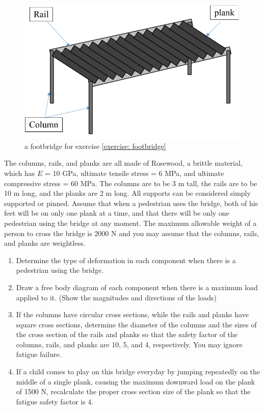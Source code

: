 \documentclass[
10pt,
a4paper,
openany,
svgnames,
]{book}
\begin{document}
\begin{exercises}
  \begin{figure}[H]
    \centering
    \includegraphics[scale=0.8]{pictures/Simple-load-bearing/footbridge}
    \caption{a footbridge for exercise \ref{exercise: footbridge}}
    \label{fig: footbridge exercise}
  \end{figure}
  
  The columns, rails, and planks are all made of Rosewood, a brittle material, which has $E$ = 10 GPa, ultimate tensile stress = 6 MPa, and ultimate compressive stress = 60 MPa. The columns are to be 3 m tall, the rails are to be 10 m long, and the planks are 2 m long. All supports can be considered simply supported or pinned. Assume that when a pedestrian uses the bridge, both of his feet will be on only one plank at a time, and that there will be only one pedestrian using the bridge at any moment. The maximum allowable weight of a person to cross the bridge is 2000 N and you may assume that the columns, rails, and planks are weightless.
  \begin{enumerate}
  \item Determine the type of deformation in each component when there is a pedestrian using the bridge.
  \item Draw a free body diagram of each component when there is a maximum load applied to it. (Show the magnitudes and directions of the loads)
  \item If the columns have circular cross sections, while the rails and planks have square cross sections, determine the diameter of the columns and the sizes of the cross section of the rails and planks so that the safety factor of the columns, rails, and planks are 10, 5, and 4, respectively. You may ignore fatigue failure.
  \item If a child comes to play on this bridge everyday by jumping repeatedly on the middle of a single plank, causing the maximum downward load on the plank of 1500 N, recalculate the proper cross section size of the plank so that the fatigue safety factor is 4.
  \end{enumerate}
\end{exercises}
\end{document}
